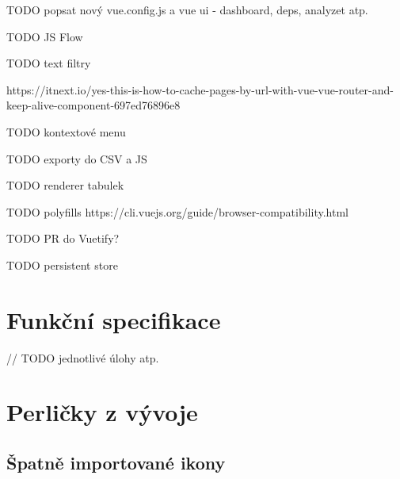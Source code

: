 
TODO popsat nový vue.config.js a vue ui - dashboard, deps, analyzet atp.

TODO JS Flow

TODO text filtry

https://itnext.io/yes-this-is-how-to-cache-pages-by-url-with-vue-vue-router-and-keep-alive-component-697ed76896e8

TODO kontextové menu

TODO exporty do CSV a JS

TODO renderer tabulek

TODO polyfills https://cli.vuejs.org/guide/browser-compatibility.html

TODO PR do Vuetify?

TODO persistent store


\section{Funkční specifikace}

// TODO jednotlivé úlohy atp.


\section{Perličky z vývoje}

\subsection{Špatně importované ikony}

